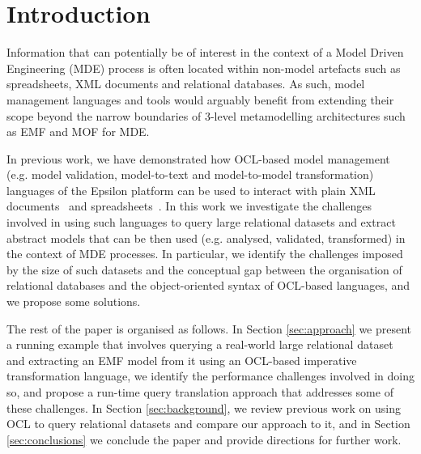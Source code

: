 \section{Introduction}

Information that can potentially be of interest in the context of a Model Driven Engineering (MDE) process is often located within non-model artefacts such as spreadsheets, XML documents and relational databases. 
As such, model management languages and tools would arguably benefit from extending their scope beyond the narrow boundaries of 3-level metamodelling architectures such as EMF and MOF for MDE.

In previous work, we have demonstrated how OCL-based model management (e.g. model validation, model-to-text and model-to-model transformation) languages of the Epsilon platform \cite{EpsilonICECCS} can be used to interact with plain XML documents~\cite{EpsilonXML} and spreadsheets~\cite{EpsilonSpreadsheets}. 
In this work we investigate the challenges involved in using such languages to query large relational datasets and extract abstract models that can be then used (e.g. analysed, validated, transformed) in the context of MDE processes.
In particular, we identify the challenges imposed by the size of such datasets and the conceptual gap between the organisation of relational databases and the object-oriented syntax of OCL-based languages, and we propose some solutions.

The rest of the paper is organised as follows. 
In Section \ref{sec:approach} we present a running example that involves querying a real-world large relational dataset and extracting an EMF model from it using an OCL-based imperative transformation language, we identify the performance challenges involved in doing so, and propose a run-time query translation approach that addresses some of these challenges. 
In Section \ref{sec:background}, we review previous work on using OCL to query relational datasets and compare our approach to it, and in Section \ref{sec:conclusions} we conclude the paper and provide directions for further work.